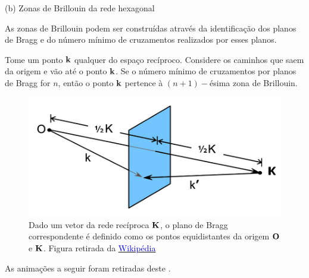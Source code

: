 \documentclass[aspectratio=169]{beamer}
\begin{document}
\begin{frame}{(b) Zonas de Brillouin da rede hexagonal}

As zonas de Brillouin podem ser construídas através da identificação dos planos de Bragg e do número mínimo de cruzamentos realizados por esses planos.

\n

Tome um ponto $\vb{k}$ qualquer do espaço recíproco. Considere os caminhos que saem da origem e vão até o ponto $\vb{k}$. Se o número mínimo de cruzamentos por planos de Bragg for $n$, então o ponto $\vb{k}$ pertence à $(n+1)-$ésima zona de Brillouin.

\begin{figure}[H]
\centering
\includegraphics[width=0.35\linewidth]{fig/bragg-plane.png}
\caption{Dado um vetor da rede recíproca $\vb{K}$, o plano de Bragg correspondente é definido como os pontos equidistantes da origem $\vb{O}$ e $\vb{K}$. Figura retirada da \href{https://en.wikipedia.org/wiki/Bragg_plane}{\textcolor{blue}{Wikipédia}}}
\label{fig:bragg-plane}
\end{figure}

As animações a seguir foram retiradas deste \href{https://www.doitpoms.ac.uk/tlplib/brillouin_zones/zone_construction.php}{\color{blue}{website}}.

\end{frame}


\end{document}
